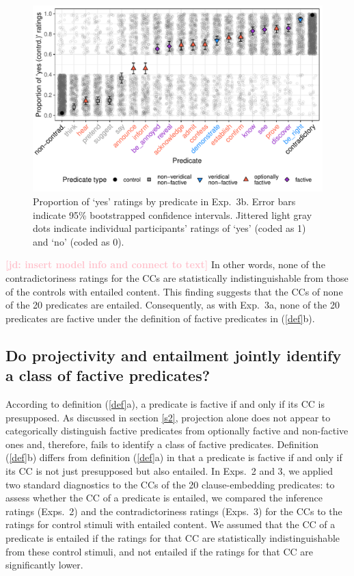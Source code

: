 \documentclass[11pt,fleqn]{article}
\newcommand{\jd}[1]{\textbf{\textcolor{Pink}{[jd: #1]}}}
\newcommand{\6}{\mbox{$[\hspace*{-.6mm}[$}}
\newcommand{\9}{\mbox{$]\hspace*{-.6mm}]$}}
\begin{document}
{\begin{figure}[h!]
\centering
\includegraphics[width=.7\paperwidth]{../../results/6-veridicality2-binary/graphs/proportion-by-predicate-variability-individual}
\caption{Proportion of `yes' ratings by predicate in Exp.~3b. Error bars indicate 95\% bootstrapped confidence intervals. Jittered light gray dots indicate individual participants' ratings of `yes' (coded as 1) and `no' (coded as 0). }
\label{fig:3bresults}
\end{figure}

\jd{insert model info and connect to text} In other words, none of the contradictoriness ratings for the CCs are statistically indistinguishable from those of the controls with entailed content. This finding suggests that the CCs of none of the 20 predicates are entailed. Consequently, as with Exp.~3a, none of the 20 predicates are factive under the definition of factive predicates in (\ref{def}b). 

\subsection{Do projectivity and entailment jointly identify a class of factive predicates?}\label{s33}

According to definition (\ref{def}a), a predicate is factive if and only if its CC is presupposed. As discussed in section \ref{s2}, projection alone does not appear to categorically distinguish factive predicates from optionally factive and non-factive ones and, therefore, fails to identify a class of factive predicates. Definition (\ref{def}b) differs from definition (\ref{def}a) in that a predicate is factive if and only if its CC is not just presupposed but also entailed. In Exps.~2 and 3, we applied two standard diagnostics to the CCs of the 20 clause-embedding predicates: to assess whether the CC of a predicate is entailed, we compared the inference ratings (Exps.~2) and the contradictoriness ratings (Exps.~3) for the CCs to the ratings for control stimuli with entailed content. We assumed that the CC of a predicate is entailed if the ratings for that CC are statistically indistinguishable from these control stimuli, and not entailed if the ratings for that CC are significantly lower. 

}
\end{document}
